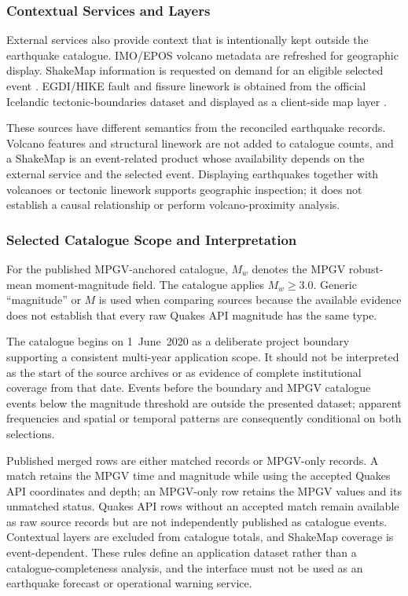 \documentclass[12pt]{article}
\begin{document}
\subsubsection{Contextual Services and Layers}

External services also provide context that is intentionally kept outside the earthquake catalogue. IMO/EPOS volcano metadata are refreshed for geographic display. ShakeMap information is requested on demand for an eligible selected event \cite{imo_epos_api}. EGDI/HIKE fault and fissure linework is obtained from the official Icelandic tectonic-boundaries dataset and displayed as a client-side map layer \cite{egdi_hike_iceland_tectonics}.

These sources have different semantics from the reconciled earthquake records. Volcano features and structural linework are not added to catalogue counts, and a ShakeMap is an event-related product whose availability depends on the external service and the selected event. Displaying earthquakes together with volcanoes or tectonic linework supports geographic inspection; it does not establish a causal relationship or perform volcano-proximity analysis.

\subsubsection{Selected Catalogue Scope and Interpretation}

For the published MPGV-anchored catalogue, \(M_w\) denotes the MPGV robust-mean moment-magnitude field. The catalogue applies \(M_w \geq 3.0\). Generic ``magnitude'' or \(M\) is used when comparing sources because the available evidence does not establish that every raw Quakes API magnitude has the same type.

The catalogue begins on 1~June~2020 as a deliberate project boundary supporting a consistent multi-year application scope. It should not be interpreted as the start of the source archives or as evidence of complete institutional coverage from that date. Events before the boundary and MPGV catalogue events below the magnitude threshold are outside the presented dataset; apparent frequencies and spatial or temporal patterns are consequently conditional on both selections.

Published merged rows are either matched records or MPGV-only records. A match retains the MPGV time and magnitude while using the accepted Quakes API coordinates and depth; an MPGV-only row retains the MPGV values and its unmatched status. Quakes API rows without an accepted match remain available as raw source records but are not independently published as catalogue events. Contextual layers are excluded from catalogue totals, and ShakeMap coverage is event-dependent. These rules define an application dataset rather than a catalogue-completeness analysis, and the interface must not be used as an earthquake forecast or operational warning service.
\end{document}
